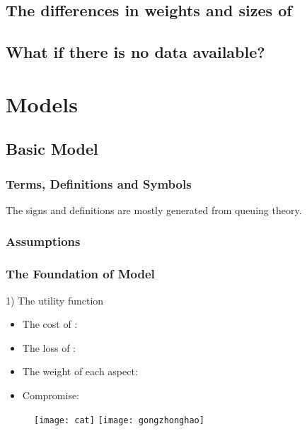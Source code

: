 \documentclass{apmcmthesis}
\begin{document}
\subsection{The differences in weights and sizes of}


\subsection{What if there is no data available?}






\section{Models}
\subsection{Basic Model}


\subsubsection{Terms, Definitions and Symbols}
The signs and definitions are mostly generated from queuing theory.


\subsubsection{Assumptions}


\subsubsection{The Foundation of Model}
1) The utility function

\begin{itemize}
\item The cost of       :
\item The loss of       :
\item The weight of each aspect:
\item Compromise:
\end{itemize}



\begin{figure}[!ht]
  \centering
  \texttt{[image: cat]}  \quad  \texttt{[image: gongzhonghao]}
  \caption{}\label{cat1}
\end{figure}
\end{document}
